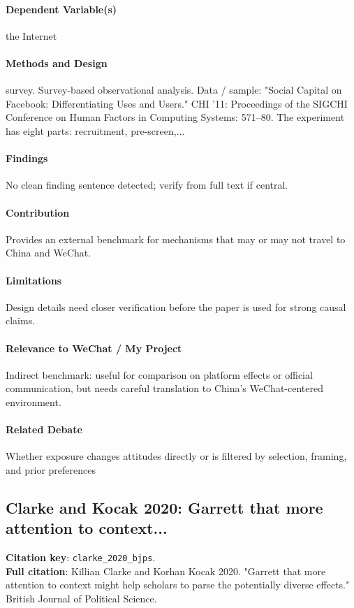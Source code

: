 \documentclass[12pt]{article}
\begin{document}
\paragraph{Dependent Variable(s)} the Internet

\paragraph{Methods and Design} survey. Survey-based observational analysis. Data / sample: "Social Capital on Facebook: Differentiating Uses and Users." CHI '11: Proceedings of the SIGCHI Conference on Human Factors in Computing Systems: 571--80. The experiment has eight parts: recruitment, pre-screen,...

\paragraph{Findings} No clean finding sentence detected; verify from full text if central.

\paragraph{Contribution} Provides an external benchmark for mechanisms that may or may not travel to China and WeChat.

\paragraph{Limitations} Design details need closer verification before the paper is used for strong causal claims.

\paragraph{Relevance to WeChat / My Project} Indirect benchmark: useful for comparison on platform effects or official communication, but needs careful translation to China's WeChat-centered environment.

\paragraph{Related Debate} Whether exposure changes attitudes directly or is filtered by selection, framing, and prior preferences


\subsection{Clarke and Kocak 2020: Garrett that more attention to context...}
\textbf{Citation key}: \texttt{clarke\_2020\_bjps}.\\
\textbf{Full citation}: Killian Clarke and Korhan Kocak 2020. "Garrett that more attention to context might help scholars to parse the potentially diverse effects." British Journal of Political Science.
\end{document}
